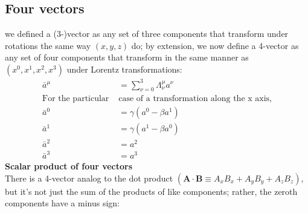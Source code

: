  

\subsection{Four vectors}
 we defined a (3-)vector as any set of three components that transform under rotations the same way $(x, y, z)$ do; by extension, we now define a 4-vector as any set of four components that transform in the same manner as $\left(x^{0}, x^{1}, x^{2}, x^{3}\right)$ under Lorentz transformations:
\begin{align*}
 \bar{a}^{\mu}&=\sum_{\nu=0}^{3} \Lambda_{\nu}^{\mu} a^{\nu}\\
\text{For the particular  }&\text{case of a transformation along the x axis,}\\
	\bar{a}^{0}&=\gamma\left(a^{0}-\beta a^{1}\right) \\
	\bar{a}^{1}&=\gamma\left(a^{1}-\beta a^{0}\right) \\
	\bar{a}^{2}&=a^{2} \\
	\bar{a}^{3}&=a^{3}
\end{align*}
\textbf{Scalar product of four vectors}\\
There is a 4-vector analog to the dot product $\left(\mathbf{A} \cdot \mathbf{B} \equiv A_{x} B_{x}+A_{y} B_{y}+A_{z} B_{z}\right)$, but it's not just the sum of the products of like components; rather, the zeroth components have a minus sign:
